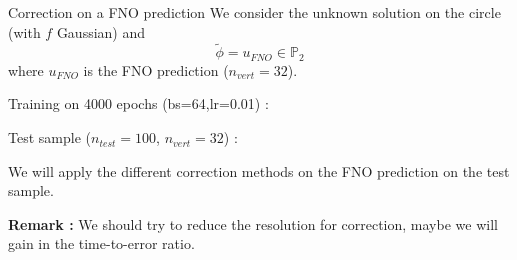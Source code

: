 \documentclass[compress,10pt,xcolor={table,dvipsnames},t]{beamer}
\begin{document}
	\begin{frame}[allowframebreaks]{Correction on a FNO prediction}
		We consider the unknown solution on the circle (with $f$ Gaussian) and
		$$\tilde{\phi}=u_{FNO}\in\mathbb{P}_{2}$$
		where $u_{FNO}$ is the FNO prediction ($n_{vert}=32$). 
		
		\begin{minipage}{0.48\linewidth}
			Training on 4000 epochs (bs=64,lr=0.01) :
			\centering
		\end{minipage}
		\begin{minipage}{0.48\linewidth}
			Test sample ($n_{test}=100$, $n_{vert}=32$) :
			\centering
		\end{minipage}	
		
		\newpage
		
		We will apply the different correction methods on the FNO prediction on the test sample. \\
		\begin{minipage}{0.58\linewidth}
			\centering
		\end{minipage} \;
		\begin{minipage}{0.38\linewidth}
			\centering
		\end{minipage}
	
		\textbf{Remark :} We should try to reduce the resolution for correction, maybe we will gain in the time-to-error ratio.
	\end{frame}
\end{document}
